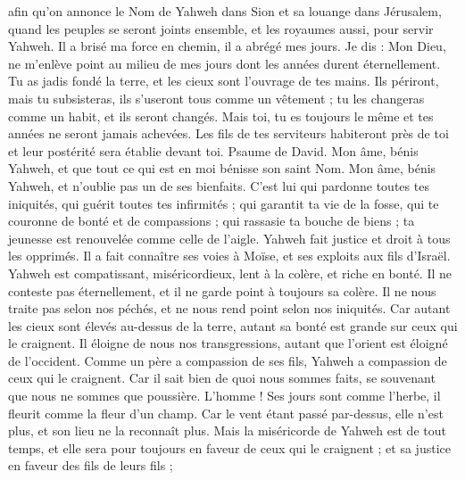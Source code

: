 \begin{multicols}{2}
afin qu'on annonce le Nom de Yahweh dans Sion et sa louange dans Jérusalem,
quand les peuples se seront joints ensemble, et les royaumes aussi, pour servir Yahweh.
Il a brisé ma force en chemin, il a abrégé mes jours.
Je dis : Mon Dieu, ne m'enlève point au milieu de mes jours dont les années durent éternellement.
Tu as jadis fondé la terre, et les cieux sont l'ouvrage de tes mains.
Ils périront, mais tu subsisteras, ils s'useront tous comme un vêtement ; tu les changeras comme un habit, et ils seront changés.
Mais toi, tu es toujours le même et tes années ne seront jamais achevées.
Les fils de tes serviteurs habiteront près de toi et leur postérité sera établie devant toi.
\VerseOne{}Psaume de David. Mon âme, bénis Yahweh, et que tout ce qui est en moi bénisse son saint Nom.
Mon âme, bénis Yahweh, et n'oublie pas un de ses bienfaits.
C'est lui qui pardonne toutes tes iniquités, qui guérit toutes tes infirmités ;
qui garantit ta vie de la fosse, qui te couronne de bonté et de compassions ;
qui rassasie ta bouche de biens ; ta jeunesse est renouvelée comme celle de l'aigle.
Yahweh fait justice et droit à tous les opprimés.
Il a fait connaître ses voies à Moïse, et ses exploits aux fils d'Israël.
Yahweh est compatissant, miséricordieux, lent à la colère, et riche en bonté.
Il ne conteste pas éternellement, et il ne garde point à toujours sa colère.
Il ne nous traite pas selon nos péchés, et ne nous rend point selon nos iniquités.
Car autant les cieux sont élevés au-dessus de la terre, autant sa bonté est grande sur ceux qui le craignent.
Il éloigne de nous nos transgressions, autant que l'orient est éloigné de l'occident.
Comme un père a compassion de ses fils, Yahweh a compassion de ceux qui le craignent.
Car il sait bien de quoi nous sommes faits, se souvenant que nous ne sommes que poussière.
L'homme ! Ses jours sont comme l'herbe, il fleurit comme la fleur d'un champ.
Car le vent étant passé par-dessus, elle n'est plus, et son lieu ne la reconnaît plus.
Mais la miséricorde de Yahweh est de tout temps, et elle sera pour toujours en faveur de ceux qui le craignent ; et sa justice en faveur des fils de leurs fils ;

\end{multicols}

